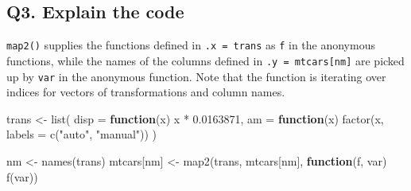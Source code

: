 \documentclass[
]{book}
\newenvironment{Shaded}{\begin{snugshade}}{\end{snugshade}}
\newcommand{\AttributeTok}[1]{\textcolor[rgb]{0.77,0.63,0.00}{#1}}
\newcommand{\CommentTok}[1]{\textcolor[rgb]{0.56,0.35,0.01}{\textit{#1}}}
\newcommand{\ControlFlowTok}[1]{\textcolor[rgb]{0.13,0.29,0.53}{\textbf{#1}}}
\newcommand{\FloatTok}[1]{\textcolor[rgb]{0.00,0.00,0.81}{#1}}
\newcommand{\FunctionTok}[1]{\textcolor[rgb]{0.00,0.00,0.00}{#1}}
\newcommand{\NormalTok}[1]{#1}
\newcommand{\OtherTok}[1]{\textcolor[rgb]{0.56,0.35,0.01}{#1}}
\newcommand{\SpecialCharTok}[1]{\textcolor[rgb]{0.00,0.00,0.00}{#1}}
\newcommand{\StringTok}[1]{\textcolor[rgb]{0.31,0.60,0.02}{#1}}
\begin{document}
\begin{Shaded}
\end{Shaded}

\hypertarget{q3.-explain-the-code}{%
\subsection*{Q3. Explain the code}\label{q3.-explain-the-code}}

\texttt{map2()} supplies the functions defined in \texttt{.x\ =\ trans} as \texttt{f} in the anonymous functions, while the names of the columns defined in \texttt{.y\ =\ mtcars{[}nm{]}} are picked up by \texttt{var} in the anonymous function. Note that the function is iterating over indices for vectors of transformations and column names.

\begin{Shaded}
\begin{Highlighting}[]
\NormalTok{trans }\OtherTok{\textless{}{-}} \FunctionTok{list}\NormalTok{(}
  \AttributeTok{disp =} \ControlFlowTok{function}\NormalTok{(x) x }\SpecialCharTok{*} \FloatTok{0.0163871}\NormalTok{,}
  \AttributeTok{am =} \ControlFlowTok{function}\NormalTok{(x) }\FunctionTok{factor}\NormalTok{(x, }\AttributeTok{labels =} \FunctionTok{c}\NormalTok{(}\StringTok{"auto"}\NormalTok{, }\StringTok{"manual"}\NormalTok{))}
\NormalTok{)}

\NormalTok{nm }\OtherTok{\textless{}{-}} \FunctionTok{names}\NormalTok{(trans)}
\NormalTok{mtcars[nm] }\OtherTok{\textless{}{-}} \FunctionTok{map2}\NormalTok{(trans, mtcars[nm], }\ControlFlowTok{function}\NormalTok{(f, var) }\FunctionTok{f}\NormalTok{(var))}
\end{Highlighting}
\end{Shaded}
\end{document}
